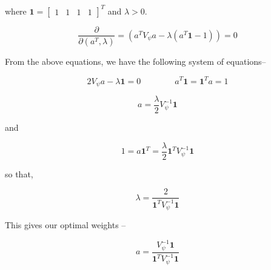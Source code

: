 \documentclass[hidelinks]{article}
\begin{document}
where $\boldsymbol{1} = \begin{bmatrix} 1 & 1 & 1 & 1 \end{bmatrix}^T$ and $\lambda > 0$.  

\begingroup
\large
\begin{equation*}
\frac{\partial }{\partial \left( a^T, \lambda \right)} = \left( a^T V_\psi a - \lambda \left(a^T \boldsymbol{1} - 1 \right) \right)= 0 
\end{equation*}
\endgroup

From the above equations, we have the following system of equations--

\begingroup
\large
\begin{equation*}
2 V_\psi a - \lambda \boldsymbol{1} = 0  \qquad \qquad a^T \boldsymbol{1} =  \boldsymbol{1}^T a = 1
\end{equation*}
\endgroup

\begin{equation*}
a = \frac{\lambda}{2} V_\psi^{-1} \boldsymbol{1} 
\end{equation*}

and

\begin{equation*}
1 = a \boldsymbol{1}^T = \frac{\lambda}{2} \boldsymbol{1} ^T V_\psi^{-1} \boldsymbol{1}
\end{equation*}

so that,

\begingroup
\large 
\begin{equation*}
\lambda = \frac{2}{\boldsymbol{1}^T V_\psi^{-1} \boldsymbol{1}}
\end{equation*}
 \endgroup
 
 This gives our optimal weights --
 
 \begingroup
 \large
 \begin{equation*}
 a = \frac{V_\psi^{-1} \boldsymbol{1}} {\boldsymbol{1}^T V_\psi^{-1} \boldsymbol{1}}
\end{equation*}
\endgroup


 
\end{document}
